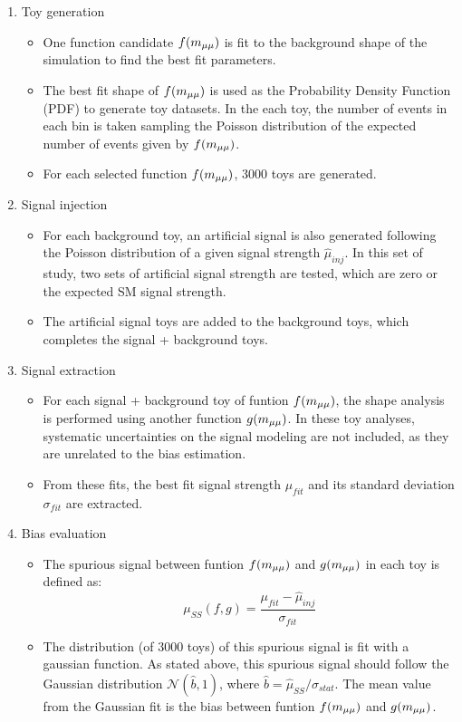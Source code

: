 \begin{enumerate}
  \item Toy generation
  \begin{itemize}
    \item One function candidate $f(m_{\mu\mu})$ is fit to the background shape of the simulation to find the best fit parameters.
    \item The best fit shape of $f(m_{\mu\mu})$ is used as the Probability Density Function (PDF) to generate toy datasets. 
          In the each toy, the number of events in each bin is taken sampling the Poisson distribution of the expected number of events given by $f(m_{\mu\mu})$. 
    \item For each selected function $f(m_{\mu\mu})$, 3000 toys are generated.      
  \end{itemize}

  \item Signal injection
  \begin{itemize}
    \item For each background toy, an artificial signal is also generated following the Poisson distribution of a given signal strength $\hat{\mu}_{inj}$. 
          In this set of study, two sets of artificial signal strength are tested, which are zero or the expected SM signal strength.
    \item The artificial signal toys are added to the background toys, which completes the signal + background toys.
  \end{itemize}
  
  \item Signal extraction
  \begin{itemize}
    \item For each signal + background toy of funtion $f(m_{\mu\mu})$, the shape analysis is performed using another function $g(m_{\mu\mu})$.
          In these toy analyses, systematic uncertainties on the signal modeling are not included, as they are unrelated to the bias estimation. 
    \item From these fits, the best fit signal strength $\mu_{fit}$ and its standard deviation $\sigma_{fit}$ are extracted.
  \end{itemize}

  \item Bias evaluation
  \begin{itemize}
    \item The spurious signal between funtion $f(m_{\mu\mu})$ and $g(m_{\mu\mu})$ in each toy is defined as: 
          \begin{equation}\label{eq:bias}
            \mu_{SS}(f, g) = \frac{\mu_{fit}-\hat{\mu}_{inj}}{\sigma_{fit}}
          \end{equation}
    \item The distribution (of 3000 toys) of this spurious signal is fit with a gaussian function. 
          As stated above, this spurious signal should follow the Gaussian distribution $\mathcal{N}(\hat{b}, 1)$,
          where $\hat{b} = \hat{\mu}_{SS} / \sigma_{stat}$.
          The mean value from the Gaussian fit is the bias between funtion $f(m_{\mu\mu})$ and $g(m_{\mu\mu})$.
  \end{itemize}
\end{enumerate}




